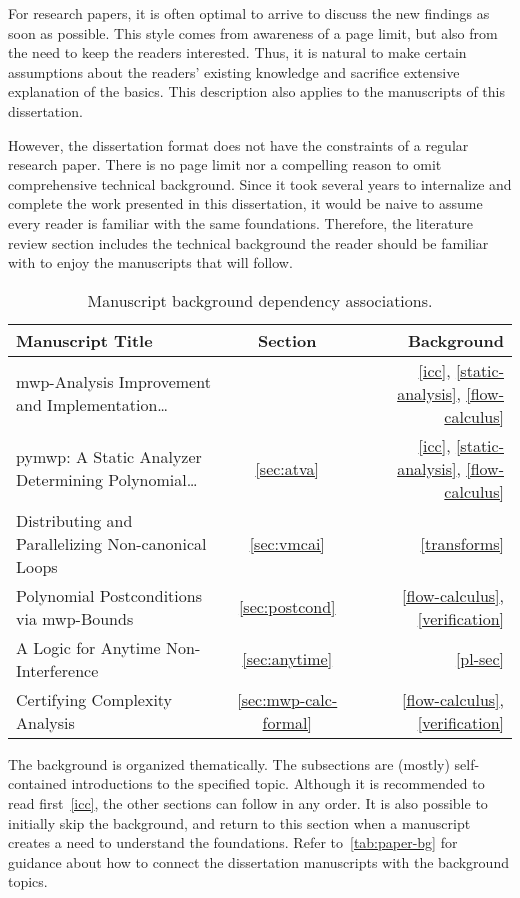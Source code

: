 
For research papers, it is often optimal to arrive to discuss the new findings
as soon as possible. This style comes from awareness of a page limit, but also
from the need to keep the readers interested. Thus, it is natural to make
certain assumptions about the readers' existing knowledge and sacrifice
extensive explanation of the basics. This description also applies to the
manuscripts of this dissertation.

However, the dissertation format does not have the constraints of a regular
research paper. There is no page limit nor a compelling reason to omit
comprehensive technical background. Since it took several years to internalize
and complete the work presented in this dissertation, it would be naive to
assume every reader is familiar with the same foundations. Therefore, the
literature review section includes the technical background the reader should be
familiar with to enjoy the manuscripts that will follow.

\begin{table}[h!]
\begin{NiceTabularX}{\linewidth}{@{}Xcr@{}}
\toprule
\textbf{Manuscript Title} & \textbf{Section} & \textbf{Background} \\
\midrule
{mwp-Analysis Improvement and Implementation\ldots}
    & 
    & \ref{icc}, \ref{static-analysis}, \ref{flow-calculus} \\
{pymwp: A Static Analyzer Determining Polynomial\ldots}
    & \ref{sec:atva}
    & \ref{icc}, \ref{static-analysis}, \ref{flow-calculus} \\
{Distributing and Parallelizing Non-canonical Loops}
    & \ref{sec:vmcai}
    & \ref{transforms} \\
{Polynomial Postconditions via mwp-Bounds}
    & \ref{sec:postcond}
    & \ref{flow-calculus}, \ref{verification} \\
{A Logic for Anytime Non-Interference}
    & \ref{sec:anytime}
    & \ref{pl-sec} \\
{Certifying Complexity Analysis}
    & \ref{sec:mwp-calc-formal}
    & \ref{flow-calculus}, \ref{verification} \\
\bottomrule
\end{NiceTabularX}
\caption[Manuscript background dependency associations]
{Manuscript background dependency associations.}
\label{tab:paper-bg}
\end{table}

The background is organized thematically. The subsections are (mostly)
self-contained introductions to the specified topic. Although it is recommended
to read first~\autoref{icc}, the other sections can follow in any order. It is
also possible to initially skip the background, and return to this section when
a manuscript creates a need to understand the foundations. Refer
to~\autoref{tab:paper-bg} for guidance about how to connect the dissertation
manuscripts with the background topics.
